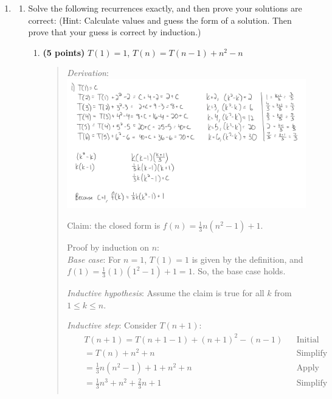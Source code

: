 \documentclass[11pt]{article}
\begin{document}
\begin{enumerate}[leftmargin=*]
\item \begin{enumerate}
    \item Solve the following recurrences exactly, and then prove your solutions are correct:
    (Hint: Calculate values and guess the form of a solution. Then prove that your guess is correct by induction.)
    \begin{enumerate}
        \item
        {\bf (5 points)} 
        $T(1) = 1$, $T(n) = T(n-1) + n^2 - n$
        \begin{quote}
          \color{purple}
          \medskip
          \textit{Derivation}: \\
          \includegraphics[width=0.8\linewidth]{"./pics/4ai.png"}

          \medskip
          Claim: the closed form is $f(n) = \frac{1}{3}n(n^2 - 1) + 1$.

          \medskip
          Proof by induction on $n$: \\ 
          \textit{Base case}: For $n = 1$, $T(1) = 1$ is given by the definition, and $f(1) = \frac{1}{3}(1)(1^2 - 1) + 1 = 1$. So, the base case holds.

          \medskip
          \textit{Inductive hypothesis}: Assume the claim is true for all $k$ from $1 \leq k \leq n$.

          \medskip
          \textit{Inductive step}: Consider $T(n + 1)$:
          \begin{align*}
              && T(n + 1) = T(n + 1 - 1) + (n + 1)^2 - (n - 1) && \text{Initial} && \\
              && = T(n) + n^2 + n && \text{Simplify} && \\
              && = \frac{1}{3}n(n^2 - 1) + 1 + n^2 + n && \text{Apply inductive hypothesis} && \\
              && = \frac{1}{3}n^3 + n^2 + \frac{2}{3}n + 1 && \text{Simplify} && \\
          \end{align*} 


\end{quote}
\end{enumerate}
\end{enumerate}
\end{enumerate}
\end{document}
